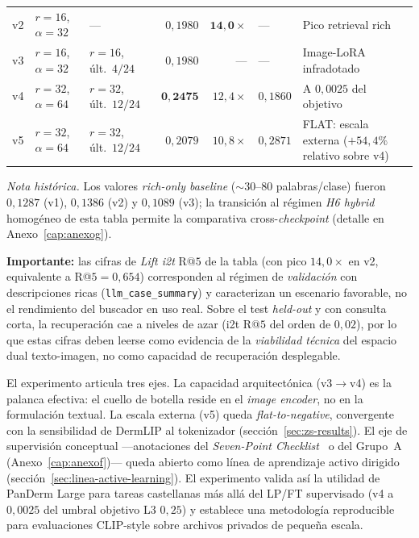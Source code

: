 \begin{table}[H]
{\begin{tabular}{lllrrll}
v2 & $r=16$, $\alpha=32$       & ---                          & $0{,}1980$          & $\mathbf{14{,}0\times}$   & ---                                 & Pico retrieval rich \\
v3 & $r=16$, $\alpha=32$       & $r=16$, últ.~$4/24$           & $0{,}1980$          & ---                       & ---                                 & Image-LoRA infradotado \\
v4 & $r=32$, $\alpha=64$       & $r=32$, últ.~$12/24$          & $\mathbf{0{,}2475}$ & $12{,}4\times$            & $0{,}1860$   & A $0{,}0025$ del objetivo \\
v5 & $r=32$, $\alpha=64$       & $r=32$, últ.~$12/24$          & $0{,}2079$          & $10{,}8\times$            & $0{,}2871$   & FLAT: escala externa ($+54{,}4\%$ relativo sobre v4) \\
\hline
\end{tabular}}

\smallskip
\footnotesize
\textit{Nota histórica.} Los valores \emph{rich-only baseline}
($\sim 30$--$80$ palabras/clase) fueron $0{,}1287$ (v1), $0{,}1386$
(v2) y $0{,}1089$ (v3); la transición al régimen \emph{H6 hybrid}
homogéneo de esta tabla permite la comparativa cross-\emph{checkpoint}
(detalle en Anexo~\ref{cap:anexog}).
\normalsize
\end{table}

\textbf{Importante:} las cifras de \emph{Lift i2t} R@$5$ de la tabla
(con pico $14{,}0\times$ en v2, equivalente a R@$5 = 0{,}654$)
corresponden al régimen de \emph{validación} con descripciones ricas
(\texttt{llm\_case\_summary}) y caracterizan un escenario favorable, no el
rendimiento del buscador en uso real. Sobre el test \emph{held-out} y con
consulta corta, la recuperación cae a niveles de azar (i2t R@$5$ del orden
de $0{,}02$), por lo que estas cifras deben leerse como evidencia de la
\emph{viabilidad técnica} del espacio dual texto-imagen, no como capacidad
de recuperación desplegable.

El experimento articula tres ejes. La capacidad arquitectónica
(v3$\to$v4) es la palanca efectiva: el cuello de botella reside en el
\emph{image encoder}, no en la formulación textual. La escala externa
(v5) queda \emph{flat-to-negative}, convergente con la sensibilidad de
DermLIP al tokenizador (sección~\ref{sec:zs-results}). El eje de
supervisión conceptual ---anotaciones del \emph{Seven-Point
Checklist}~\cite{kawahara2019} o del Grupo~A (Anexo~\ref{cap:anexof})---
queda abierto como línea de aprendizaje activo dirigido
(sección~\ref{sec:linea-active-learning}). El experimento valida así la
utilidad de PanDerm Large para tareas castellanas más allá del LP/FT
supervisado (v4 a $0{,}0025$ del umbral objetivo L3 $0{,}25$) y
establece una metodología reproducible para evaluaciones CLIP-style
sobre archivos privados de pequeña escala.
